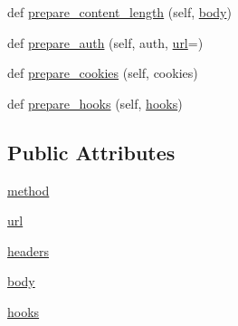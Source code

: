 \begin{DoxyCompactItemize}
\item 
def \hyperlink{classpip_1_1__vendor_1_1requests_1_1models_1_1PreparedRequest_a7d3d5b668ee1795e2d7e7fffb84141e6}{prepare\+\_\+content\+\_\+length} (self, \hyperlink{classpip_1_1__vendor_1_1requests_1_1models_1_1PreparedRequest_ad235282b336607df1fe3d90f7d6daca9}{body})
\item 
def \hyperlink{classpip_1_1__vendor_1_1requests_1_1models_1_1PreparedRequest_a007643c8504906ad579967187965d2c9}{prepare\+\_\+auth} (self, auth, \hyperlink{classpip_1_1__vendor_1_1requests_1_1models_1_1PreparedRequest_af848e89a53867307f151d0be189067b2}{url}=\textquotesingle{}\textquotesingle{})
\item 
def \hyperlink{classpip_1_1__vendor_1_1requests_1_1models_1_1PreparedRequest_a8a4ec0b3fa88d623586de453cd502836}{prepare\+\_\+cookies} (self, cookies)
\item 
def \hyperlink{classpip_1_1__vendor_1_1requests_1_1models_1_1PreparedRequest_a714977c63d5a9007451211592e32e34a}{prepare\+\_\+hooks} (self, \hyperlink{classpip_1_1__vendor_1_1requests_1_1models_1_1PreparedRequest_abde9f91f43f3ebc0b4da5ea4fd75a7cb}{hooks})
\end{DoxyCompactItemize}
\subsection*{Public Attributes}
\begin{DoxyCompactItemize}
\item 
\hyperlink{classpip_1_1__vendor_1_1requests_1_1models_1_1PreparedRequest_a417fd0bec96e2be4f03ee908dabb07c8}{method}
\item 
\hyperlink{classpip_1_1__vendor_1_1requests_1_1models_1_1PreparedRequest_af848e89a53867307f151d0be189067b2}{url}
\item 
\hyperlink{classpip_1_1__vendor_1_1requests_1_1models_1_1PreparedRequest_a58790d14c0978a1c297be5659606f7a1}{headers}
\item 
\hyperlink{classpip_1_1__vendor_1_1requests_1_1models_1_1PreparedRequest_ad235282b336607df1fe3d90f7d6daca9}{body}
\item 
\hyperlink{classpip_1_1__vendor_1_1requests_1_1models_1_1PreparedRequest_abde9f91f43f3ebc0b4da5ea4fd75a7cb}{hooks}
\end{DoxyCompactItemize}


